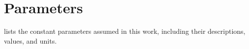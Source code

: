 \documentclass[a4paper,fleqn,colorlinks,unicode,lineno]{cas-dc} %
\begin{document}

\section{Parameters}
\label{sec:appendix-parameters}
 lists the constant parameters assumed in this work, including their descriptions, values, and units.
\end{document}

